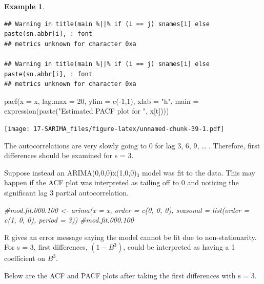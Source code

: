 \documentclass[
]{book}
\newenvironment{Shaded}{\begin{snugshade}}{\end{snugshade}}
\newcommand{\AttributeTok}[1]{\textcolor[rgb]{0.77,0.63,0.00}{#1}}
\newcommand{\CommentTok}[1]{\textcolor[rgb]{0.56,0.35,0.01}{\textit{#1}}}
\newcommand{\DecValTok}[1]{\textcolor[rgb]{0.00,0.00,0.81}{#1}}
\newcommand{\FunctionTok}[1]{\textcolor[rgb]{0.00,0.00,0.00}{#1}}
\newcommand{\NormalTok}[1]{#1}
\newcommand{\SpecialCharTok}[1]{\textcolor[rgb]{0.00,0.00,0.00}{#1}}
\newcommand{\StringTok}[1]{\textcolor[rgb]{0.31,0.60,0.02}{#1}}
\theoremstyle{definition}
\theoremstyle{definition}
\newtheorem{example}{Example}[chapter]
\theoremstyle{definition}
\theoremstyle{definition}
\theoremstyle{remark}
\begin{document}
\begin{example}
\begin{verbatim}
## Warning in title(main %||% if (i == j) snames[i] else paste(sn.abbr[i], : font
## metrics unknown for character 0xa

## Warning in title(main %||% if (i == j) snames[i] else paste(sn.abbr[i], : font
## metrics unknown for character 0xa
\end{verbatim}

\begin{Shaded}
\begin{Highlighting}[]
\FunctionTok{pacf}\NormalTok{(}\AttributeTok{x =}\NormalTok{ x, }\AttributeTok{lag.max =} \DecValTok{20}\NormalTok{, }\AttributeTok{ylim =} \FunctionTok{c}\NormalTok{(}\SpecialCharTok{{-}}\DecValTok{1}\NormalTok{,}\DecValTok{1}\NormalTok{), }\AttributeTok{xlab =} \StringTok{"h"}\NormalTok{, }
    \AttributeTok{main =} \FunctionTok{expression}\NormalTok{(}\FunctionTok{paste}\NormalTok{(}\StringTok{"Estimated PACF plot for "}\NormalTok{, }
\NormalTok{    x[t])))}
\end{Highlighting}
\end{Shaded}

\texttt{[image: 17-SARIMA\_files/figure-latex/unnamed-chunk-39-1.pdf]}

The autocorrelations are very slowly going to 0 for lag 3, 6, 9, \ldots{} . Therefore, first differences should be examined for s = 3.

Suppose instead an ARIMA(0,0,0)x(1,0,0)\(_3\) model was fit to the data. This may happen if the ACF plot was interpreted as tailing off to 0 and noticing the significant lag 3 partial autocorrelation.

\begin{Shaded}
\begin{Highlighting}[]
\CommentTok{\#mod.fit.000.100 \textless{}{-} arima(x = x, order = c(0, 0, 0), seasonal = list(order = c(1, 0, 0), period = 3))}
\CommentTok{\#mod.fit.000.100}
\end{Highlighting}
\end{Shaded}

R gives an error message saying the model cannot be fit due to non-stationarity. For s = 3, first differences, \((1-B^3)\), could be interpreted as having a 1 coefficient on \(B^3\).

Below are the ACF and PACF plots after taking the first differences with s = 3.


\end{example}
\end{document}
